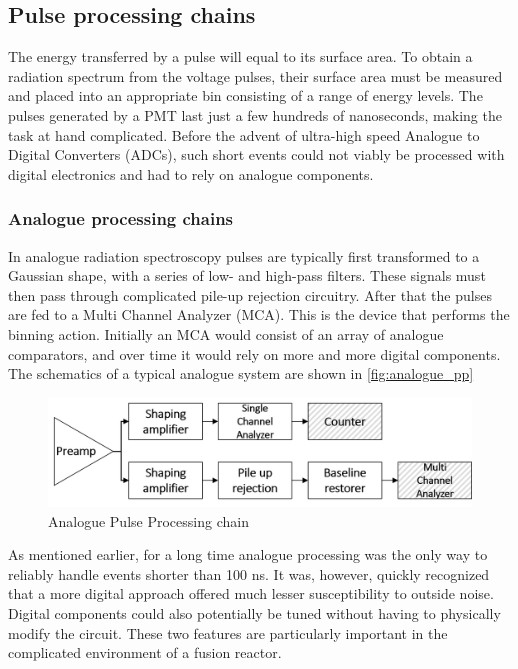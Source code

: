 \subsection{Pulse processing chains}

The energy transferred by a pulse will equal to its surface area.
To obtain a radiation spectrum from the voltage pulses,
their surface area must be measured and
placed into an appropriate bin consisting of a range of energy levels.
The pulses generated by a PMT last just a few hundreds of nanoseconds,
making the task at hand complicated.
Before the advent of ultra-high speed Analogue to Digital Converters (ADCs),
such short events could not viably be processed with digital 
electronics and had to rely on analogue components.

\newpage
\subsubsection{Analogue processing chains}

In analogue radiation spectroscopy
pulses are typically first transformed to a Gaussian shape,
with a series of low- and high-pass filters.
These signals must then pass through complicated pile-up
rejection circuitry. After that the pulses 
are fed to a Multi Channel Analyzer (MCA).
This is the device that performs the binning action.
Initially an MCA would consist of an array of 
analogue comparators, and over time it would rely 
on more and more digital components.
The schematics of a typical analogue system are shown in \autoref{fig:analogue_pp}

\begin{figure}[H]
  \centering
  \includegraphics[width=\linewidth]{media/analog_pulse_processing.png}
  \caption{Analogue Pulse Processing chain}
  \label{fig:analogue_pp}
\end{figure}


As mentioned earlier, for a long time analogue processing 
was the only way to reliably handle events shorter than 100 ns. 
It was, however, quickly recognized
that a more digital approach offered 
much lesser susceptibility to outside noise. 
Digital components could also potentially be tuned without
having to physically modify the circuit.
These two features are particularly important in the 
complicated environment of a fusion reactor.
\cite{analog_vs_digital_1998}

